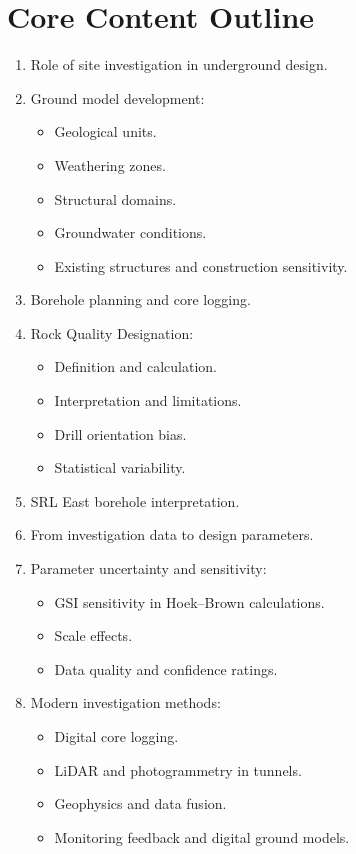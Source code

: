 \documentclass[12pt,oneside]{book}
\begin{document}
\section{Core Content Outline}
\begin{enumerate}
    \item Role of site investigation in underground design.
    \item Ground model development:
    \begin{itemize}
        \item Geological units.
        \item Weathering zones.
        \item Structural domains.
        \item Groundwater conditions.
        \item Existing structures and construction sensitivity.
    \end{itemize}
    \item Borehole planning and core logging.
    \item Rock Quality Designation:
    \begin{itemize}
        \item Definition and calculation.
        \item Interpretation and limitations.
        \item Drill orientation bias.
        \item Statistical variability.
    \end{itemize}
    \item SRL East borehole interpretation.
    \item From investigation data to design parameters.
    \item Parameter uncertainty and sensitivity:
    \begin{itemize}
        \item GSI sensitivity in Hoek--Brown calculations.
        \item Scale effects.
        \item Data quality and confidence ratings.
    \end{itemize}
    \item Modern investigation methods:
    \begin{itemize}
        \item Digital core logging.
        \item LiDAR and photogrammetry in tunnels.
        \item Geophysics and data fusion.
        \item Monitoring feedback and digital ground models.
    \end{itemize}
\end{enumerate}
\end{document}
